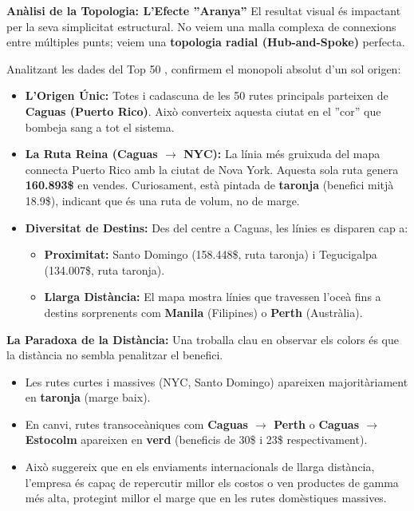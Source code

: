 \documentclass[12pt,a4paper]{article}
\begin{document}
\textbf{Anàlisi de la Topologia: L'Efecte ''Aranya''}
El resultat visual és impactant per la seva simplicitat estructural. No veiem una malla complexa de connexions entre múltiples punts; veiem una \textbf{topologia radial (Hub-and-Spoke)} perfecta.

Analitzant les dades del Top 50 , confirmem el monopoli absolut d'un sol origen:
\begin{itemize}
    \item \textbf{L'Origen Únic:} Totes i cadascuna de les 50 rutes principals parteixen de \textbf{Caguas (Puerto Rico)}. Això converteix aquesta ciutat en el ''cor'' que bombeja sang a tot el sistema.
    \item \textbf{La Ruta Reina (Caguas $\rightarrow$ NYC):} La línia més gruixuda del mapa connecta Puerto Rico amb la ciutat de Nova York. Aquesta sola ruta genera \textbf{160.893\$} en vendes. Curiosament, està pintada de \textbf{taronja} (benefici mitjà 18.9\$), indicant que és una ruta de volum, no de marge.
    \item \textbf{Diversitat de Destins:} Des del centre a Caguas, les línies es disparen cap a:
    \begin{itemize}
        \item \textbf{Proximitat:} Santo Domingo (158.448\$, ruta taronja) i Tegucigalpa (134.007\$, ruta taronja).
        \item \textbf{Llarga Distància:} El mapa mostra línies que travessen l'oceà fins a destins sorprenents com \textbf{Manila} (Filipines) o \textbf{Perth} (Austràlia).
    \end{itemize}
\end{itemize}

\textbf{La Paradoxa de la Distància:}
Una troballa clau en observar els colors és que la distància no sembla penalitzar el benefici.
\begin{itemize}
    \item Les rutes curtes i massives (NYC, Santo Domingo) apareixen majoritàriament en \textbf{taronja} (marge baix).
    \item En canvi, rutes transoceàniques com \textbf{Caguas $\rightarrow$ Perth} o \textbf{Caguas $\rightarrow$ Estocolm} apareixen en \textbf{verd} (beneficis de 30\$ i 23\$ respectivament).
    \item Això suggereix que en els enviaments internacionals de llarga distància, l'empresa és capaç de repercutir millor els costos o ven productes de gamma més alta, protegint millor el marge que en les rutes domèstiques massives.
\end{itemize}
\end{document}
